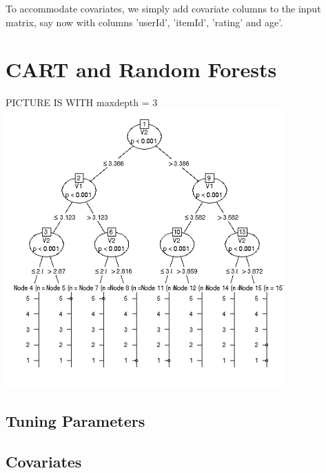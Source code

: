 To accommodate covariates, we simply add covariate columns to the input
matrix, say now with columns 'userId', 'itemId', 'rating' and age'.

\section{CART and Random Forests}

PICTURE IS WITH maxdepth = 3
\includegraphics[width=4.2in]{Images/MLmaxdepth3.png}

\subsection{Tuning Parameters}

\subsection{Covariates}

